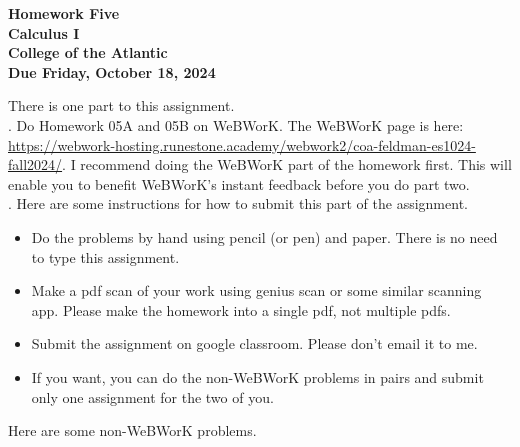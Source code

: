 \documentclass[12pt]{article}
\begin{document}
\pagestyle{empty}
 
\begin{center}
{\LARGE {\bf Homework Five}}\\
\bigskip
{\Large {\bf Calculus I}}\\
\bigskip
{\Large {\bf College of the Atlantic}}\\
\bigskip
{ {\bf Due Friday, October 18, 2024}}\\ 
\end{center}
\medskip


\noindent There is one part to this assignment.\\

.  Do Homework 05A and 05B on
WeBWorK.  The WeBWorK page is here: 
\url{https://webwork-hosting.runestone.academy/webwork2/coa-feldman-es1024-fall2024/}.
I recommend doing the WeBWorK part of the homework first.  This will
enable you to benefit WeBWorK's instant feedback before you do part
two.\\ 


.  Here are some
instructions for how to submit this part of the assignment.
\begin{itemize}
  \setlength{\itemsep}{0mm}
\item Do the problems by hand using pencil (or pen) and paper.
  There is no need to type this assignment.
\item Make a pdf scan of your work using genius scan or some
  similar scanning app.  Please make the homework into a single
  pdf, not multiple pdfs.
\item Submit the assignment on google classroom.  Please don't
  email it to me.
\item If you want, you can do the non-WeBWorK problems in pairs and
  submit only one assignment for the two of you. \\
\end{itemize}


\noindent Here are some non-WeBWorK problems.


\end{document}
